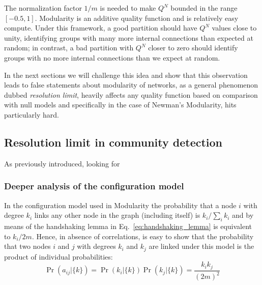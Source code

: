 The normalization factor $1/m$ is needed to make $Q^N$ bounded in the range $[-0.5,1]$. Modularity is an additive quality function and is relatively easy compute. Under this framework, a good partition should have $Q^N$ values close to unity, identifying groups with many more internal connections than expected at random; in contrast, a bad partition with $Q^N$ closer to zero should identify groups with no more internal connections than we expect at random.

In the next sections we will challenge this idea and show that this observation leads to false statements about modularity of networks, as a general phenomenon dubbed \emph{resolution limit}, heavily affects any quality function based on comparison with null models and specifically in the case of Newman's Modularity, hits particularly hard.

\subsection{Resolution limit in community detection}
As previously introduced, looking for 

\subsubsection{Deeper analysis of the configuration model}
In the configuration model used in Modularity the probability that a node $i$ with degree $k_i$ links any other node in the graph (including itself) is $k_i/\sum_{i}k_i$ and by means of the handshaking lemma in Eq.~\ref{eq:handshaking_lemma} is equivalent to $k_i/2m$.
Hence, in absence of correlations, is easy to show that the probability that two nodes $i$ and $j$ with degrees $k_i$ and $k_j$ are linked under this model is the product of individual probabilities:
\begin{equation}\label{eq:configuration_model_probability}
\Pr \left ( a_{ij} | \{ k \} \right) = \Pr(k_i | \{ k \})\Pr(k_j | \{ k \})=\frac{k_i k_j}{(2m)^2}
\end{equation}

